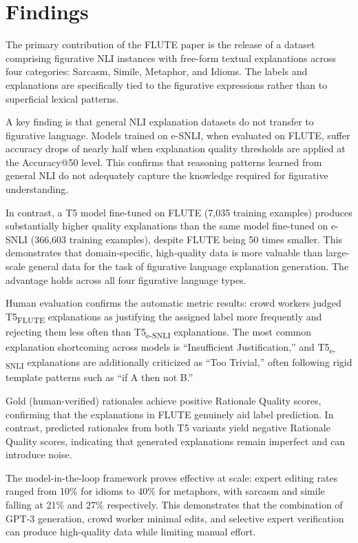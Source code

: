 \documentclass[12pt]{article}
\begin{document}
\section{Findings}

The primary contribution of the FLUTE paper is the release of a dataset comprising figurative NLI instances with free-form textual explanations across four categories: Sarcasm, Simile, Metaphor, and Idioms. The labels and explanations are specifically tied to the figurative expressions rather than to superficial lexical patterns.

A key finding is that general NLI explanation datasets do not transfer to figurative language. Models trained on e-SNLI, when evaluated on FLUTE, suffer accuracy drops of nearly half when explanation quality thresholds are applied at the Accuracy@50 level. This confirms that reasoning patterns learned from general NLI do not adequately capture the knowledge required for figurative understanding.

In contrast, a T5 model fine-tuned on FLUTE (7,035 training examples) produces substantially higher quality explanations than the same model fine-tuned on e-SNLI (366,603 training examples), despite FLUTE being 50 times smaller. This demonstrates that domain-specific, high-quality data is more valuable than large-scale general data for the task of figurative language explanation generation. The advantage holds across all four figurative language types.

Human evaluation confirms the automatic metric results: crowd workers judged T5\textsubscript{FLUTE} explanations as justifying the assigned label more frequently and rejecting them less often than T5\textsubscript{e-SNLI} explanations. The most common explanation shortcoming across models is ``Insufficient Justification,'' and T5\textsubscript{e-SNLI} explanations are additionally criticized as ``Too Trivial,'' often following rigid template patterns such as ``if A then not B.''

Gold (human-verified) rationales achieve positive Rationale Quality scores, confirming that the explanations in FLUTE genuinely aid label prediction. In contrast, predicted rationales from both T5 variants yield negative Rationale Quality scores, indicating that generated explanations remain imperfect and can introduce noise.

The model-in-the-loop framework proves effective at scale: expert editing rates ranged from 10\% for idioms to 40\% for metaphors, with sarcasm and simile falling at 21\% and 27\% respectively. This demonstrates that the combination of GPT-3 generation, crowd worker minimal edits, and selective expert verification can produce high-quality data while limiting manual effort.
\end{document}
